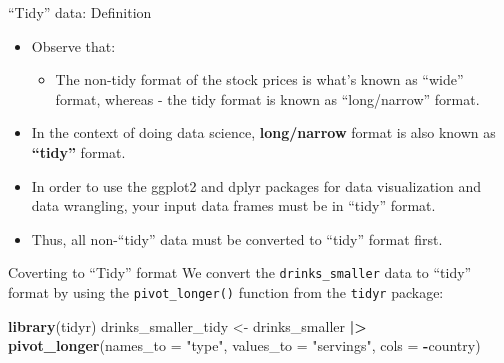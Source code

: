 \documentclass[
  ignorenonframetext,
]{beamer}
\newenvironment{Shaded}{\begin{snugshade}}{\end{snugshade}}
\newcommand{\AttributeTok}[1]{\textcolor[rgb]{0.13,0.29,0.53}{#1}}
\newcommand{\FunctionTok}[1]{\textcolor[rgb]{0.13,0.29,0.53}{\textbf{#1}}}
\newcommand{\NormalTok}[1]{#1}
\newcommand{\OtherTok}[1]{\textcolor[rgb]{0.56,0.35,0.01}{#1}}
\newcommand{\SpecialCharTok}[1]{\textcolor[rgb]{0.81,0.36,0.00}{\textbf{#1}}}
\newcommand{\StringTok}[1]{\textcolor[rgb]{0.31,0.60,0.02}{#1}}
\providecommand{\tightlist}{%
  \setlength{\itemsep}{0pt}\setlength{\parskip}{0pt}}
\begin{document}
\begin{frame}{``Tidy'' data: Definition}
\protect\hypertarget{tidy-data-definition-2}{}
\begin{itemize}
\item
  Observe that:

  \begin{itemize}
  \tightlist
  \item
    The non-tidy format of the stock prices is what's known as ``wide''
    format, whereas - the tidy format is known as ``long/narrow''
    format.
  \end{itemize}
\item
  In the context of doing data science, \textbf{long/narrow} format is
  also known as \textbf{``tidy''} format.
\item
  In order to use the ggplot2 and dplyr packages for data visualization
  and data wrangling, your input data frames must be in ``tidy'' format.
\item
  Thus, all non-``tidy'' data must be converted to ``tidy'' format
  first.
\end{itemize}
\end{frame}

\begin{frame}[fragile]{Coverting to ``Tidy'' format}
\protect\hypertarget{coverting-to-tidy-format}{}
We convert the \texttt{drinks\_smaller} data to ``tidy'' format by using
the \texttt{pivot\_longer()} function from the \texttt{tidyr} package:

\normalsize

\begin{Shaded}
\begin{Highlighting}[]
\FunctionTok{library}\NormalTok{(tidyr)}
\NormalTok{drinks\_smaller\_tidy }\OtherTok{\textless{}{-}}\NormalTok{ drinks\_smaller }\SpecialCharTok{|\textgreater{}} 
  \FunctionTok{pivot\_longer}\NormalTok{(}\AttributeTok{names\_to =} \StringTok{"type"}\NormalTok{, }
               \AttributeTok{values\_to =} \StringTok{"servings"}\NormalTok{, }
               \AttributeTok{cols =} \SpecialCharTok{{-}}\NormalTok{country)}
\end{Highlighting}
\end{Shaded}

\normalsize
\end{frame}
\end{document}
